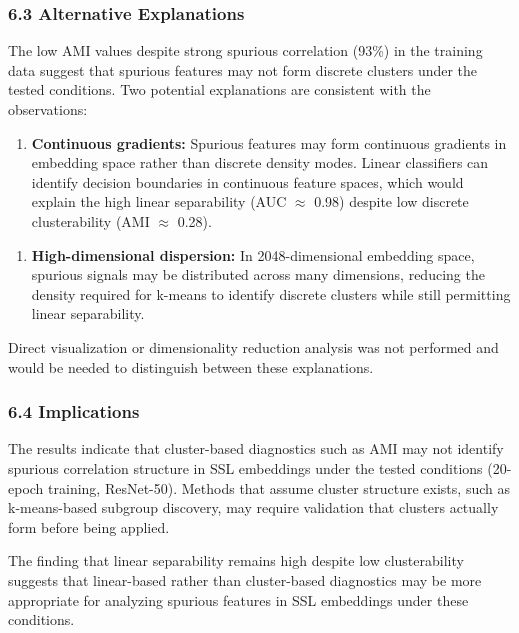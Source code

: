 \subsubsection{6.3 Alternative Explanations}

The low AMI values despite strong spurious correlation (93\%) in the training data suggest that spurious features may not form discrete clusters under the tested conditions. Two potential explanations are consistent with the observations:

\begin{enumerate}
\item \textbf{Continuous gradients:} Spurious features may form continuous gradients in embedding space rather than discrete density modes. Linear classifiers can identify decision boundaries in continuous feature spaces, which would explain the high linear separability (AUC $\approx$ 0.98) despite low discrete clusterability (AMI $\approx$ 0.28).
\end{enumerate}

\begin{enumerate}
\item \textbf{High-dimensional dispersion:} In 2048-dimensional embedding space, spurious signals may be distributed across many dimensions, reducing the density required for k-means to identify discrete clusters while still permitting linear separability.
\end{enumerate}

Direct visualization or dimensionality reduction analysis was not performed and would be needed to distinguish between these explanations.

\subsubsection{6.4 Implications}

The results indicate that cluster-based diagnostics such as AMI may not identify spurious correlation structure in SSL embeddings under the tested conditions (20-epoch training, ResNet-50). Methods that assume cluster structure exists, such as k-means-based subgroup discovery, may require validation that clusters actually form before being applied.

The finding that linear separability remains high despite low clusterability suggests that linear-based rather than cluster-based diagnostics may be more appropriate for analyzing spurious features in SSL embeddings under these conditions.

